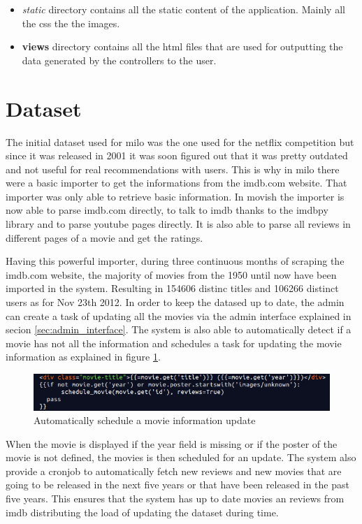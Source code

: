 \begin{itemize}
\item \textit{static} directory contains all the static content of the application. Mainly all the css the the images.
\item \textbf{views} directory contains all the html files that are used for outputting the data generated by the controllers to the user.
\end{itemize}

\section{Dataset}
\label{sec:dataset}

The initial dataset used for milo was the one used for the netflix competition \cite{netflixprize} but since it was released in 2001 it was soon figured out that it was pretty outdated and not useful for real recommendations with users. This is why in milo there were a basic importer to get the informations from the imdb.com website. That importer was only able to retrieve basic information. In movish the importer is now able to parse imdb.com directly, to talk to imdb thanks to the imdbpy \cite{imdbpy} library and to parse youtube pages directly. It is also able to parse all reviews in different pages of a movie and get the ratings.

Having this powerful importer, during three continuous months of scraping the imdb.com website, the majority of movies from the 1950 until now have been imported in the system. Resulting in 154606 distinc titles and 106266 distinct users as for Nov 23th 2012. In order to keep the datased up to date, the admin can create a task of updating all the movies via the admin interface explained in secion \ref{sec:admin_interface}. The system is also able to automatically detect if a movie has not all the information and schedules a task for updating the movie information as explained in figure \ref{fig:movie_update}.

\begin{figure}
  \centering
  \includegraphics[width=\textwidth]{figures/auto_update_movie.png}
  \caption{Automatically schedule a movie information update}
  \label{fig:movie_update}
\end{figure}

When the movie is displayed if the year field is missing or if the poster of the movie is not defined, the movies is then scheduled for an update. The system also provide a cronjob to automatically fetch new reviews and new movies that are going to be released in the next five years or that have been released in the past five years. This ensures that the system has up to date movies an reviews from imdb distributing the load of updating the dataset during time.

